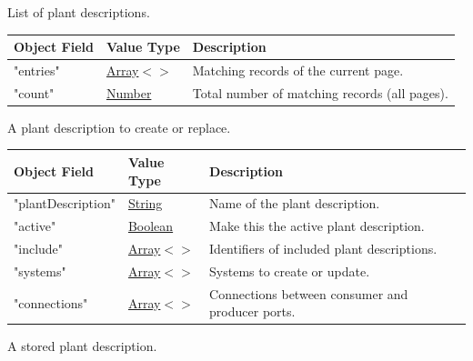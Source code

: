 \documentclass[a4paper]{arrowhead}
\newcommand{\mref}[2][]{{\textcolor{ArrowheadPurple}{\hyperref[sec:model:#2]{\ifstrempty{#1}{#2}{#1}}}}}
\newcommand{\pref}[1]{{\textcolor{ArrowheadGrey}{\hyperref[sec:model:primitives:#1]{#1}}}}
\begin{document}

List of plant descriptions.


\noindent\begin{tabularx}{\textwidth}{| >{\raggedright\arraybackslash}p{3.9cm} | >{\raggedright\arraybackslash\small}p{5.3cm} | X |} \hline
\rowcolor{gray!33} Object Field & Value Type & Description \\ \hline
"entries" & \pref{Array}$<$\allowbreak{}\mref{PlantDescriptionResponse}$>$ & Matching records of the current page. \\ \hline
"count" & \pref{Number} & Total number of matching records (all pages). \\ \hline
\end{tabularx}




A plant description to create or replace.


\noindent\begin{tabularx}{\textwidth}{| >{\raggedright\arraybackslash}p{3.9cm} | >{\raggedright\arraybackslash\small}p{5.3cm} | X |} \hline
\rowcolor{gray!33} Object Field & Value Type & Description \\ \hline
"plant\allowbreak{}Description" & \pref{String} & Name of the plant description. \\ \hline
"active" & \pref{Boolean} & Make this the active plant description. \\ \hline
"include" & \pref{Array}$<$\allowbreak{}\pref{Number}$>$ & Identifiers of included plant descriptions. \\ \hline
"systems" & \pref{Array}$<$\allowbreak{}\mref{PdeSystem}$>$ & Systems to create or update. \\ \hline
"connections" & \pref{Array}$<$\allowbreak{}\mref{Connection}$>$ & Connections between consumer and producer ports. \\ \hline
\end{tabularx}




A stored plant description.
\end{document}
